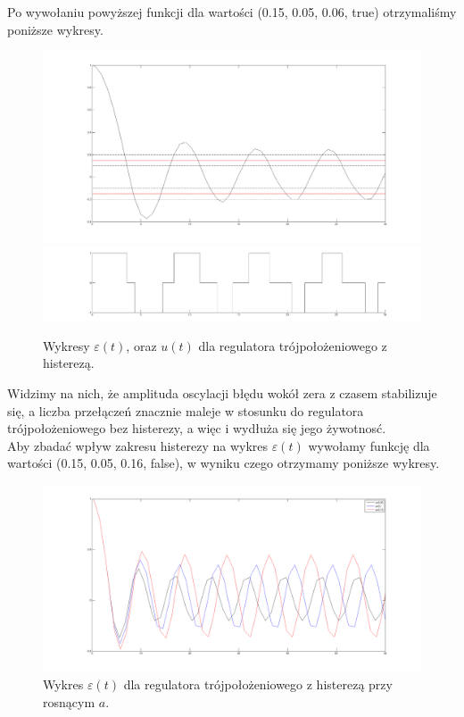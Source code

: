 \documentclass[a4paper,10pt]{article}
\begin{document}
Po wywołaniu powyższej funkcji dla wartości (0.15, 0.05, 0.06, true) otrzymaliśmy poniższe wykresy.

\begin{figure}[!h]
    \centering
	\includegraphics[width=120mm]{CW3-trojpolozeniowy-e-n015-a005.png}
	\includegraphics[width=120mm]{CW3-trojpolozeniowy-u-n015-a005.png}
	\caption{Wykresy $\varepsilon(t)$, oraz $u(t)$ dla regulatora trójpołożeniowego z histerezą.}
    \label{fig:Rysunek}
\end{figure}

Widzimy na nich, że amplituda oscylacji błędu wokół zera z czasem stabilizuje się, a liczba przełączeń znacznie maleje w stosunku do regulatora trójpołożeniowego bez histerezy, a więc i wydłuża się jego żywotnosć. \\
Aby zbadać wpływ zakresu histerezy na wykres $\varepsilon(t)$ wywołamy funkcję dla wartości (0.15, 0.05, 0.16, false), w wyniku czego otrzymamy poniższe wykresy.

\begin{figure}[!h]
    \centering
	\includegraphics[width=120mm]{CW3-trojpolozeniowy-e-n015.png}
	\caption{Wykres $\varepsilon(t)$ dla regulatora trójpołożeniowego z histerezą przy rosnącym $a$.}
    \label{fig:Rysunek}
\end{figure}
\end{document}
